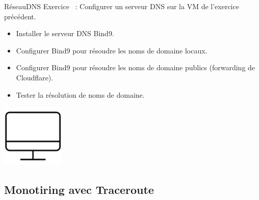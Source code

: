 \documentclass{beamer}
\begin{document}
    \begin{frame}{Réseau}{DNS}
        Exercice \execcounterdispinc~: Configurer un serveur DNS sur la VM de l'exercice précédent.
        \begin{itemize}
            \item Installer le serveur DNS Bind9.
            \item Configurer Bind9 pour résoudre les noms de domaine locaux.
            \item Configurer Bind9 pour résoudre les noms de domaine publics (forwarding de Cloudflare).
            \item Tester la résolution de noms de domaine.
        \end{itemize}
        \begin{center}
            \includegraphics[width=3cm]{image/desktop}
        \end{center}
    \end{frame}

    \subsection{Monotiring avec Traceroute}\label{subsec:mon-traceroute}
\end{document}
